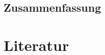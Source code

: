 \documentclass[numbers=noenddot,a4paper]{scrartcl}
\begin{document}
         \subsection{Zusammenfassung}

	\newpage

	\section{Literatur}\label{sec:lit}

		
		

%

%		
%
\end{document}
